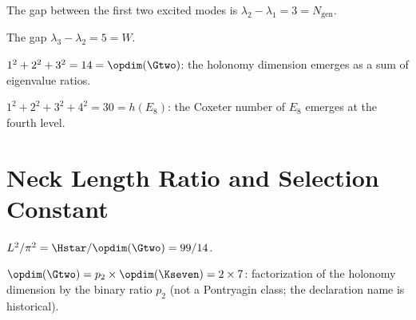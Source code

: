 \begin{theorem}[Second spectral gap $= N_{\mathrm{gen}}$]\label{thm:second_gap_Ngen}
    \leanok
    The gap between the first two excited modes is
    $\lambda_2 - \lambda_1 = 3 = N_{\mathrm{gen}}$.
\end{theorem}

\begin{theorem}[Third spectral gap $=$ Weyl factor]\label{thm:third_gap_Weyl}
    \leanok
    The gap $\lambda_3 - \lambda_2 = 5 = W$.
\end{theorem}

\begin{theorem}[Eigenvalue sum $= \opdim(\Gtwo)$]\label{thm:ev_sum_dim_G2}
    \leanok
    $1^2 + 2^2 + 3^2 = 14 = \opdim(\Gtwo)$: the holonomy dimension emerges
    as a sum of eigenvalue ratios.
\end{theorem}

\begin{theorem}[Eigenvalue sum $= h(E_8)$]\label{thm:ev_sum_coxeter_E8}
    \leanok
    $1^2 + 2^2 + 3^2 + 4^2 = 30 = h(E_8)$: the Coxeter number of $E_8$
    emerges at the fourth level.
\end{theorem}

\section{Neck Length Ratio and Selection Constant}

\begin{theorem}\label{thm:neck_ratio}
    \leanok
    $L^2/\pi^2 = \Hstar/\opdim(\Gtwo) = 99/14$.
\end{theorem}

\begin{theorem}\label{thm:kappa_structure}
    \leanok
    $\opdim(\Gtwo) = p_2 \times \opdim(\Kseven) = 2 \times 7$: factorization of the holonomy
    dimension by the binary ratio $p_2$ (not a Pontryagin class; the declaration name is historical).
\end{theorem}

